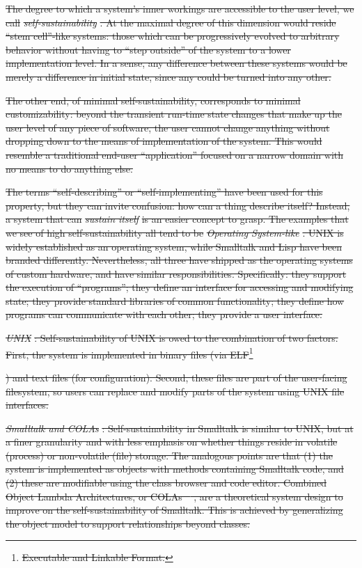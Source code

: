 \documentclass[english,submission]{programming}
\providecommand{\DIFdel}[1]{{\protect\color{red}\sout{#1}}}                      %
\begin{document}
\DIFdel{The degree to which a system's inner workings are accessible to the user
level, we call }\emph{\DIFdel{self-sustainability}}%
\DIFdel{. At the maximal degree of this
dimension would reside ``stem cell''-like systems: those which can be
progressively evolved to arbitrary behavior without having to ``step
outside'' of the system to a lower implementation level. In a sense, any
difference between these systems would be merely a difference in initial
state, since any could be turned into any other.
}%

\DIFdel{The other end, of minimal self-sustainability, corresponds to minimal
customizability: beyond the transient run-time state changes that make
up the user level of any piece of software, the user cannot change
anything without dropping down to the means of implementation of the
system. This would resemble a traditional end-user ``application''
focused on a narrow domain with no means to do anything else.
}%

\DIFdel{The terms ``self-describing'' or ``self-implementing'' have been used
for this property, but they can invite confusion: how can a thing
describe itself? Instead, a system that can }\emph{\DIFdel{sustain itself}} %
\DIFdel{is an
easier concept to grasp. The examples that we see of high
self-sustainability all tend to be }\emph{\DIFdel{Operating System-like}}%
\DIFdel{. UNIX is
widely established as an operating system, while Smalltalk and Lisp have
been branded differently. Nevertheless, all three have shipped as the
operating systems of custom hardware, and have similar responsibilities.
Specifically: they support the execution of ``programs''; they define an
interface for accessing and modifying state; they provide standard
libraries of common functionality; they define how programs can
communicate with each other; they provide a user interface.
}%

\emph{\DIFdel{UNIX}}%
\DIFdel{: Self-sustainability of UNIX is owed to the combination of
two factors. First, the system is implemented in binary files (via
ELF}\footnote{\DIFdel{Executable and Linkable Format.}}%
\addtocounter{footnote}{-1}%
\DIFdel{) and text files (for
configuration). Second, these files are part of the user-facing
filesystem, so users can replace and modify parts of the system using
UNIX file interfaces.
}%

\emph{\DIFdel{Smalltalk and COLAs}}%
\DIFdel{: Self-sustainability in Smalltalk is similar
to UNIX, but at a finer granularity and with less emphasis on whether
things reside in volatile (process) or non-volatile (file) storage. The
analogous points are that (1) the system is implemented as objects with
methods containing Smalltalk code, and (2) these are modifiable using
the class browser and code editor. Combined Object Lambda Architectures,
or COLAs \mbox{%
\cite{COLAs}}\hspace{0pt}%
, are a theoretical system design to improve on the
self-sustainability of Smalltalk. This is achieved by generalizing the
object model to support relationships beyond classes.
}%
\end{document}
